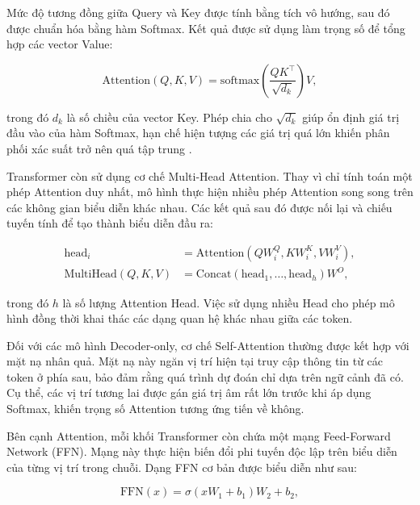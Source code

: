 Mức độ tương đồng giữa Query và Key được tính bằng tích vô hướng, sau đó được chuẩn hóa bằng hàm Softmax. Kết quả được sử dụng làm trọng số để tổng hợp các vector Value:

\begin{equation}
    \mathrm{Attention}(Q,K,V)
    =
    \mathrm{softmax}
    \left(
    \frac{QK^\top}{\sqrt{d_k}}
    \right)V,
\end{equation}

trong đó $d_k$ là số chiều của vector Key. Phép chia cho $\sqrt{d_k}$ giúp ổn định giá trị đầu vào của hàm Softmax, hạn chế hiện tượng các giá trị quá lớn khiến phân phối xác suất trở nên quá tập trung \cite{vaswani2017attention}.

Transformer còn sử dụng cơ chế Multi-Head Attention. Thay vì chỉ tính toán một phép Attention duy nhất, mô hình thực hiện nhiều phép Attention song song trên các không gian biểu diễn khác nhau. Các kết quả sau đó được nối lại và chiếu tuyến tính để tạo thành biểu diễn đầu ra:

\begin{equation}
\begin{aligned}
    \mathrm{head}_i
    &= \mathrm{Attention}
    (QW_i^Q,KW_i^K,VW_i^V),\\
    \mathrm{MultiHead}(Q,K,V)
    &= \mathrm{Concat}
    (\mathrm{head}_1,\ldots,\mathrm{head}_h)W^O,
\end{aligned}
\end{equation}

trong đó $h$ là số lượng Attention Head. Việc sử dụng nhiều Head cho phép mô hình đồng thời khai thác các dạng quan hệ khác nhau giữa các token.

Đối với các mô hình Decoder-only, cơ chế Self-Attention thường được kết hợp với mặt nạ nhân quả. Mặt nạ này ngăn vị trí hiện tại truy cập thông tin từ các token ở phía sau, bảo đảm rằng quá trình dự đoán chỉ dựa trên ngữ cảnh đã có. Cụ thể, các vị trí tương lai được gán giá trị âm rất lớn trước khi áp dụng Softmax, khiến trọng số Attention tương ứng tiến về không.

Bên cạnh Attention, mỗi khối Transformer còn chứa một mạng Feed-Forward Network (FFN). Mạng này thực hiện biến đổi phi tuyến độc lập trên biểu diễn của từng vị trí trong chuỗi. Dạng FFN cơ bản được biểu diễn như sau:

\begin{equation}
    \mathrm{FFN}(x)
    =
    \sigma(xW_1+b_1)W_2+b_2,
\end{equation}

